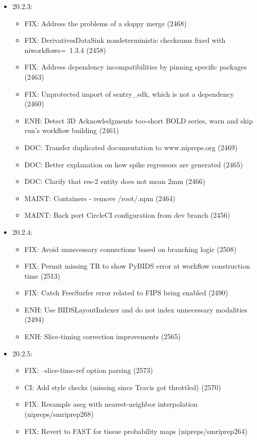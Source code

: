 \documentclass{article}
\begin{document}
\begin{appendices}
\begin{itemize}
        \item 20.2.3:
              \begin{itemize}
                  \item FIX: Address the problems of a sloppy merge (2468)
                  \item FIX: DerivativesDataSink nondeterministic checksums fixed with niworkflows=~1.3.4 (2458)
                  \item FIX: Address dependency incompatibilities by pinning specific packages (2463)
                  \item FIX: Unprotected import of sentry\_sdk, which is not a dependency (2460)
                  \item ENH: Detect 3D Acknowledgments too-short BOLD series, warn and skip run's workflow building (2461)
                  \item DOC: Transfer duplicated documentation to www.nipreps.org (2469)
                  \item DOC: Better explanation on how spike regressors are generated (2465)
                  \item DOC: Clarify that res-2 entity does not mean 2mm (2466)
                  \item MAINT: Containers - remove /root/.npm (2464)
                  \item MAINT: Back port CircleCI configuration from dev branch (2456)
              \end{itemize}
        \item 20.2.4:
              \begin{itemize}
                  \item FIX: Avoid unnecessary connections based on branching logic (2508)
                  \item FIX: Permit missing TR to show PyBIDS error at workflow construction time (2513)
                  \item FIX: Catch FreeSurfer error related to FIPS being enabled (2490)
                  \item ENH: Use BIDSLayoutIndexer and do not index unnecessary modalities (2494)
                  \item ENH: Slice-timing correction improvements (2565)
              \end{itemize}
        \item 20.2.5:
              \begin{itemize}
                  \item FIX: --slice-time-ref option parsing (2573)
                  \item CI: Add style checks (missing since Travis got throttled) (2570)
                  \item FIX: Resample aseg with nearest-neighbor interpolation (nipreps/smriprep268)
                  \item FIX: Revert to FAST for tissue probability maps (nipreps/smriprep264)
              \end{itemize}
    \end{itemize}

\end{appendices}




\end{document}
